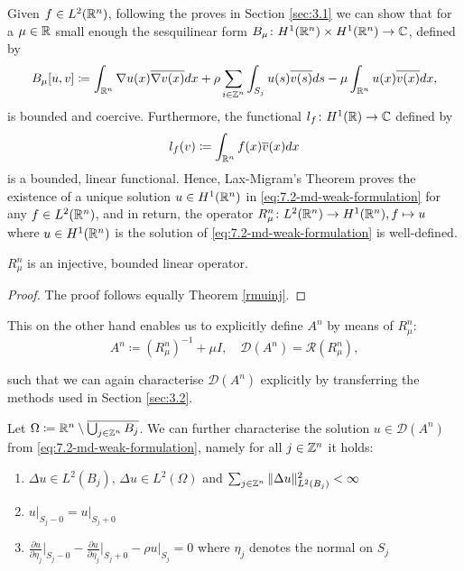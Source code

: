 Given $f \in L^{2}(\mathbb{R}^{n})$, following the proves in Section \ref{sec:3.1} we can show that for a $\mu \in \mathbb{R}$ small enough the sesquilinear form $B_{\mu} \colon H^{1}(\mathbb{R}^{n}) \times H^{1}(\mathbb{R}^{n}) \rightarrow \mathbb{C}$, defined by
\[ B_{\mu}[u, v] \coloneqq \int_{\mathbb{R}^{n}} \nabla u(x) \overline{\nabla v(x)} dx + \rho \sum_{i \in \mathbb{Z}^{n}} \int_{S_{j}} u(s) \overline{v(s)} ds - \mu \int_{\mathbb{R}^{n}} u(x) \overline{v(x)} dx, \]
 is  bounded and coercive. Furthermore, the functional $l_{f} \colon H^{1}(\mathbb{R}) \rightarrow \mathbb{C}$ defined by
	\[ l_{f}(v) \coloneqq \int_{\mathbb{R}^{n}} f(x) \overline{v}(x) dx \]
is a bounded, linear functional. Hence, Lax-Migram's Theorem proves the existence of a unique solution $u \in H^{1}(\mathbb{R}^{n})$ in \eqref{eq:7.2-md-weak-formulation} for any $f \in L^{2}(\mathbb{R}^{n})$, and in return, the operator $R_{\mu}^{n} \colon L^{2}(\mathbb{R}^{n}) \rightarrow H^{1}(\mathbb{R}^{n}), f \mapsto u$ where $u \in H^{1}(\mathbb{R}^{n})$ is the solution of \eqref{eq:7.2-md-weak-formulation} is well-defined. 

\begin{theorem} 
	$R_{\mu}^{n}$ is an injective, bounded linear operator. 
	
	\begin{proof}
		The proof follows equally Theorem \ref{rmuinj}.
	\end{proof}
\end{theorem}

This on the other hand enables us to explicitly define $A^{n}$ by means of $R_{\mu}^{n}$:
\[ A^{n} \coloneqq \left(R_{\mu}^{n}\right)^{-1} + \mu I, \quad \mathcal{D}(A^{n}) = \mathcal{R}(R_{\mu}^{n}), \]

such that we can again characterise $\mathcal{D}(A^{n})$ explicitly by transferring the methods used in Section \ref{sec:3.2}.

\begin{theorem} Let $\Omega \coloneqq \mathbb{R}^{n} \setminus \overline{\bigcup_{j \in \mathbb{Z}^{n}} B_{j}}$. We can further characterise the solution $u \in \mathcal{D}(A^{n})$ from \eqref{eq:7.2-md-weak-formulation}, namely for all $j \in \mathbb{Z}^{n}$ it holds:
	\begin{enumerate} %
		\item $\Delta u \in L^{2}(B_{j})$, $\Delta u \in L^{2}(\Omega)$ and $\sum_{j \in \mathbb{Z}^{n}} \|\Delta u \|_{L^{2}(B_{j})}^{2} < \infty$
		\item $u \big|_{S_{j} - 0} = u \big|_{S_{j} + 0}$
		\item $\frac{\partial u}{\partial \eta_{j}} \big|_{S_{j} - 0} - \frac{\partial u}{\partial \eta_{j}} \big|_{S_{j} + 0} - \rho u \big|_{S_{j}} = 0$ where $\eta_{j}$ denotes the normal on $S_{j}$
	\end{enumerate}
\end{theorem}

